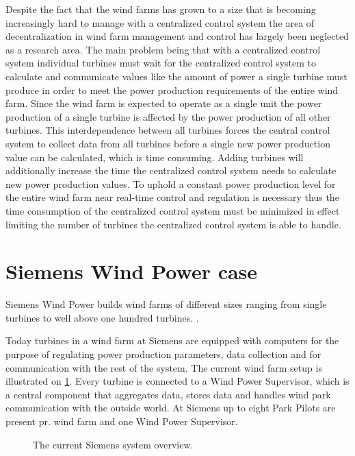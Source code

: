 Despite the fact that the wind farms has grown to a size that is becoming increasingly hard to manage with a centralized control system the area of decentralization in wind farm management and control has largely been neglected as a research area. The main problem being that with a centralized control system individual turbines must wait for the centralized control system to calculate and communicate values like the amount of power a single turbine must produce in order to meet the power production requirements of the entire wind farm. Since the wind farm is expected to operate as a single unit the power production of a single turbine is affected by the power production of all other turbines. This interdependence between all turbines forces the central control system to collect data from all turbines before a single new power production value can be calculated, which is time consuming. Adding turbines will additionally increase the time the centralized control system needs to calculate new power production values. To uphold a constant power production level for the entire wind farm near real-time control and regulation is necessary thus the time consumption of the centralized control system must be minimized in effect limiting the number of turbines the centralized control system is able to handle.

\section{Siemens Wind Power case}


\label{sec:SiemensCase}
Siemens Wind Power builds wind farms of different sizes ranging from single turbines to well above one hundred turbines. \cite{simensOffShoreProjects, simensOnShoreProjects}.

Today turbines in a wind farm at Siemens are equipped with computers for the purpose of regulating power production parameters, data collection and for communication with the rest of the system. The current wind farm setup is illustrated on \cref{fig:currentSiemensSetup}. Every turbine is connected to a Wind Power Supervisor, which is a central component that aggregates data, stores data and handles wind park communication with the outside world. At Siemens up to eight Park Pilots are present pr. wind farm and one Wind Power Supervisor.

\begin{figure}
	\centering
	\scalebox{0.7}{}
	\caption[The current Siemens wind farm system overview]{
		\label{fig:currentSiemensSetup} 
		\footnotesize{%
			The current Siemens system overview.
		}
	}
\end{figure}

